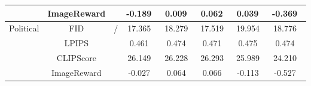 \begin{table*}
{\begin{tabular}{c|c|c|c|c|c|c|c|c|c|c|c|c|c|c|c}
\cline{2-2}\cline{12-16}
                                                                            & ImageReward & \multicolumn{9}{c|}{}                                                                   & -0.189~ & 0.009~  & 0.062~  & 0.039~  & -0.369~  \\ 
\hline
\multirow{4}{*}{Political}                                                  & FID         & \multicolumn{9}{c|}{\multirow{4}{*}{/}}                                                 & 17.365~ & 18.279~ & 17.519~ & 19.954~ & 18.776~  \\ 
\cline{2-2}\cline{12-16}
                                                                            & LPIPS       & \multicolumn{9}{c|}{}                                                                   & 0.461~  & 0.474~  & 0.471~  & 0.475~  & 0.474~   \\ 
\cline{2-2}\cline{12-16}
                                                                            & CLIPScore   & \multicolumn{9}{c|}{}                                                                   & 26.149~ & 26.228~ & 26.293~ & 25.989~ & 24.210~  \\ 
\cline{2-2}\cline{12-16}
                                                                            & ImageReward & \multicolumn{9}{c|}{}                                                                   & -0.027~ & 0.064~  & 0.066~  & -0.113~ & -0.527~  \\
\bottomrule
\end{tabular}
}
\end{table*}
